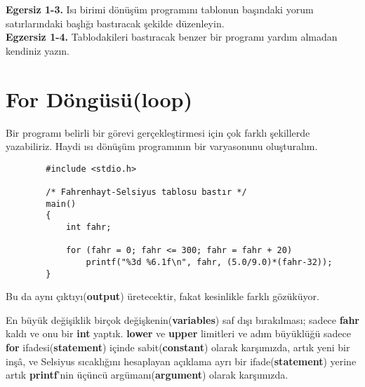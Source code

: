 \documentclass[a4paper,12pt,oneside]{book}
\begin{document}
\textbf{Egersiz 1-3.} Isı birimi dönüşüm programını tablonun başındaki yorum satırlarındaki başlığı bastıracak şekilde düzenleyin. \\


\textbf{Egzersiz 1-4.} Tablodakileri bastıracak benzer bir programı yardım almadan kendiniz yazın.

\section{For Döngüsü(\textbf{loop})}

\par Bir programı belirli bir görevi gerçekleştirmesi için çok farklı şekillerde yazabiliriz. Haydi ısı dönüşüm programının bir varyasonunu oluşturalım.

\begin{lstlisting}
        #include <stdio.h>

        /* Fahrenhayt-Selsiyus tablosu bastır */
        main()
        {
            int fahr;

            for (fahr = 0; fahr <= 300; fahr = fahr + 20)
                printf("%3d %6.1f\n", fahr, (5.0/9.0)*(fahr-32));
        }
\end{lstlisting}

Bu da aynı çıktıyı(\textbf{output}) üretecektir, fakat kesinlikle farklı gözüküyor.

\pagebreak En büyük değişiklik birçok değişkenin(\textbf{variables}) saf dışı bırakılması; sadece \textbf{fahr} kaldı ve onu bir \textbf{int} yaptık. \textbf{lower} ve \textbf{upper} limitleri ve adım büyüklüğü sadece \textbf{for} ifadesi(\textbf{statement}) içinde sabit(\textbf{constant}) olarak karşımızda, artık yeni bir inşâ, ve Selsiyus sıcaklığını hesaplayan açıklama ayrı bir ifade(\textbf{statement}) yerine artık \textbf{printf}'nin üçüncü argümanı(\textbf{argument}) olarak karşımızda.

\par
\end{document}
